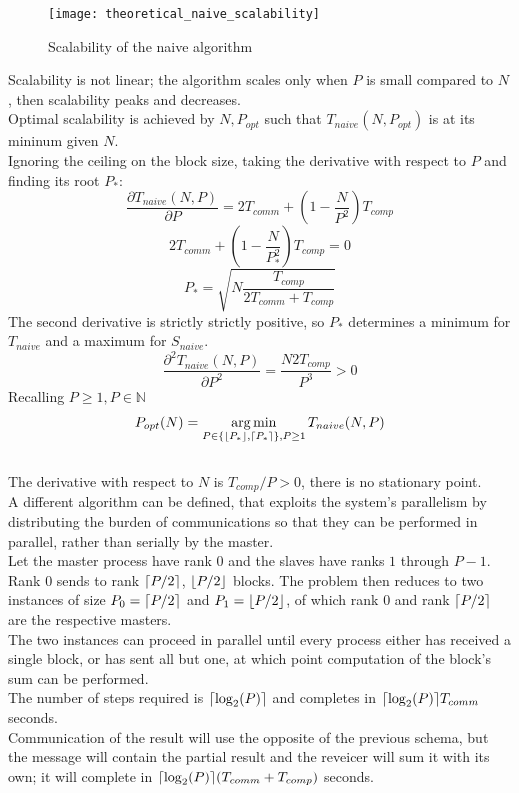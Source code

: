 \documentclass[a4paper, 11pt, twoside, openright]{article}
\DeclareMathOperator*{\argmin}{arg\,min}
\DeclarePairedDelimiter{\ceil}{\lceil}{\rceil}
\DeclarePairedDelimiter{\floor}{\lfloor}{\rfloor}
\begin{document}
\begin{figure}[h]
    \texttt{[image: theoretical\_naive\_scalability]}
    \caption{Scalability of the naive algorithm}
\end{figure}
\FloatBarrier
Scalability is not linear; the algorithm scales only when $P$ is small compared to $N$, then scalability peaks and decreases.\\
Optimal scalability is achieved by $N, P_{opt}$ such that $T_{naive}(N, P_{opt})$ is at its mininum given $N$.\\
Ignoring the ceiling on the block size, taking the derivative with respect to $P$ and finding its root $P_{*}$:
$$\frac{\partial T_{naive}(N, P)}{\partial P} = 2T_{comm} + \left(1-\frac{N}{P^{2}}\right)T_{comp}$$
$$2T_{comm} + \left(1-\frac{N}{P_{*}^{2}}\right)T_{comp} = 0$$
$$P_{*} = \sqrt{N\frac{T_{comp}}{2T_{comm} + T_{comp}}}$$
The second derivative is strictly strictly positive, so $P_{*}$ determines a minimum for $T_{naive}$ and a maximum for $S_{naive}$.
$$\frac{\partial^{2} T_{naive}(N, P)}{\partial P^{2}} = \frac{N2T_{comp}}{P^{3}} > 0$$
Recalling $P \geq 1, P \in \mathbb{N}$
$$P_{opt}(N) = \argmin_{P \in \{ \floor{P_{*}}, \ceil{P_{*}} \}, P \geq 1 }{T_{naive}(N, P)} $$\\
The derivative with respect to $N$ is $T_{comp}/P > 0$, there is no stationary point.\\
A different algorithm can be defined, that exploits the system's parallelism by distributing the burden of communications so that they can be performed in parallel, rather than serially by the master.\\
Let the master process have rank $0$ and the slaves have ranks $1$ through $P-1$.\\
Rank $0$ sends to rank $\ceil*{P/2}$, $\floor*{P/2}$ blocks. The problem then reduces to two instances of size $P_{0}=\ceil*{P/2}$ and $P_{1}=\floor*{P/2}$, of which rank $0$ and rank $\ceil*{P/2}$ are the respective masters.\\
The two instances can proceed in parallel until every process either has received a single block, or has sent all but one, at which point computation of the block's sum can be performed.\\
The number of steps required is $\ceil*{\log_{2}(P)}$ and completes in $\ceil*{\log_{2}(P)}T_{comm}$ seconds.\\
Communication of the result will use the opposite of the previous schema, but the message will contain the partial result and the reveicer will sum it with its own; it will complete in $\ceil*{\log_{2}(P)}(T_{comm} + T_{comp})$ seconds.\\
\end{document}
